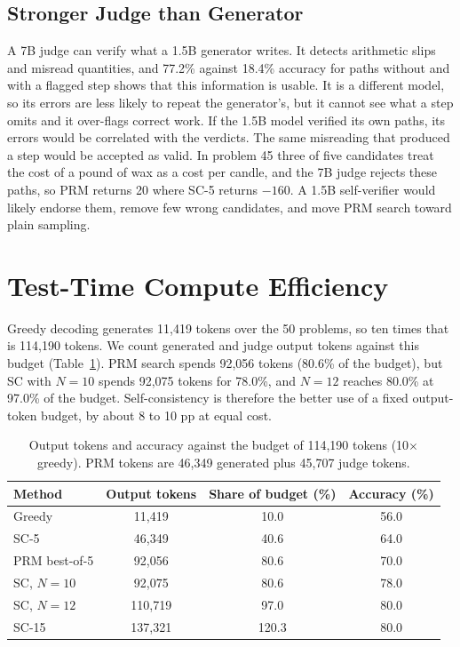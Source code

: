\documentclass{article}
\begin{document}
\subsection{Stronger Judge than Generator}
A 7B judge can verify what a 1.5B generator writes. It detects arithmetic slips and misread quantities, and 77.2\% against 18.4\% accuracy for paths without and with a flagged step shows that this information is usable. It is a different model, so its errors are less likely to repeat the generator's, but it cannot see what a step omits and it over-flags correct work. If the 1.5B model verified its own paths, its errors would be correlated with the verdicts. The same misreading that produced a step would be accepted as valid. In problem 45 three of five candidates treat the cost of a pound of wax as a cost per candle, and the 7B judge rejects these paths, so PRM returns 20 where SC-5 returns $-160$. A 1.5B self-verifier would likely endorse them, remove few wrong candidates, and move PRM search toward plain sampling.

\section{Test-Time Compute Efficiency}
Greedy decoding generates 11,419 tokens over the 50 problems, so ten times that is 114,190 tokens. We count generated and judge output tokens against this budget (Table~\ref{tab:budget}). PRM search spends 92,056 tokens (80.6\% of the budget), but SC with $N=10$ spends 92,075 tokens for 78.0\%, and $N=12$ reaches 80.0\% at 97.0\% of the budget. Self-consistency is therefore the better use of a fixed output-token budget, by about 8 to 10 pp at equal cost.

\begin{table}[t]
\centering
\caption{Output tokens and accuracy against the budget of 114,190 tokens (10$\times$ greedy). PRM tokens are 46,349 generated plus 45,707 judge tokens.}
\label{tab:budget}
\footnotesize
\begin{tabular}{lccc}
\toprule
Method & Output tokens & Share of budget (\%) & Accuracy (\%) \\
\midrule
Greedy & 11,419 & 10.0 & 56.0 \\
SC-5 & 46,349 & 40.6 & 64.0 \\
PRM best-of-5 & 92,056 & 80.6 & 70.0 \\
SC, $N=10$ & 92,075 & 80.6 & 78.0 \\
SC, $N=12$ & 110,719 & 97.0 & 80.0 \\
SC-15 & 137,321 & 120.3 & 80.0 \\
\bottomrule
\end{tabular}
\end{table}
\end{document}
